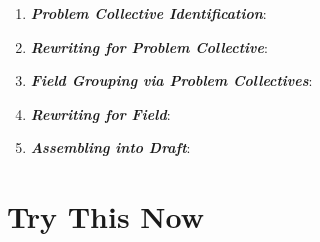 \documentclass[11pt]{article}
\begin{document}
\begin{itemize}
\begin{enumerate}
\item  \emph{\textbf{Problem Collective Identification}}:

\item  \emph{\textbf{Rewriting for Problem Collective}}:

\item  \emph{\textbf{Field Grouping via Problem Collectives}}:

\item  \emph{\textbf{Rewriting for Field}}:

\item  \emph{\textbf{Assembling into Draft}}:
\end{enumerate}
\end{itemize}


\newpage
\section{Try This Now}
\end{document}
